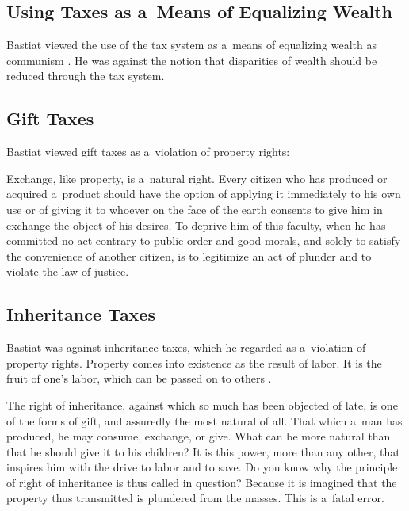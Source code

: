 \subsection{Using Taxes as a~Means of Equalizing Wealth }



Bastiat viewed the use of the tax system as a~means of equalizing wealth as communism 
\parencite[][p.111]{bastiat_selected_1964}. %
 He was against the notion that disparities of wealth should be reduced through the tax system.



\subsection{Gift Taxes }



Bastiat viewed gift taxes as a~violation of property rights:



Exchange, like property, is a~natural right. Every citizen who has produced or acquired a~product should have the option of applying it immediately to his own use or of giving it to whoever on the face of the earth consents to give him in exchange the object of his desires. To deprive him of this faculty, when he has committed no act contrary to public order and good morals, and solely to satisfy the convenience of another citizen, is to legitimize an act of plunder and to violate the law of justice. 
\parencite[][p.112]{bastiat_selected_1964}%




\subsection{Inheritance Taxes }



Bastiat was against inheritance taxes, which he regarded as a~violation of property rights. Property comes into existence as the result of labor. It is the fruit of one's labor, which can be passed on to others 
\parencite[][pp.188–193]{bastiat_selected_1964}.%




The right of inheritance, against which so much has been objected of late, is one of the forms of gift, and assuredly the most natural of all. That which a~man has produced, he may consume, exchange, or give. What can be more natural than that he should give it to his children? It is this power, more than any other, that inspires him with the drive to labor and to save. Do you know why the principle of right of inheritance is thus called in question? Because it is imagined that the property thus transmitted is plundered from the masses. This is a~fatal error. 
\parencite[][p.142]{bastiat_bastiat_2007}%




